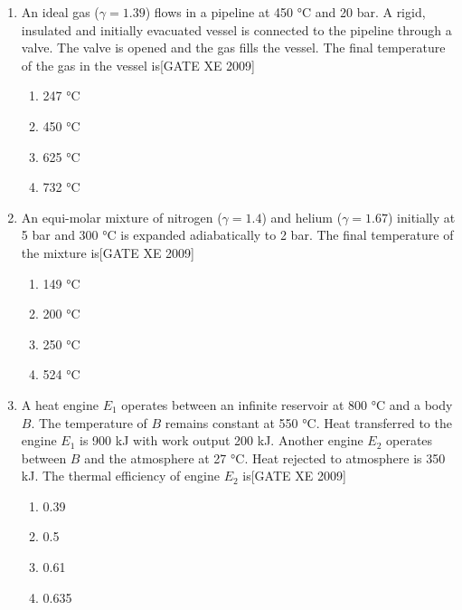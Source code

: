\documentclass[journal,12pt,onecolumn]{IEEEtran}
\theoremstyle{remark}
\begin{document}
\begin{enumerate}
\item An ideal gas ($\gamma=1.39$) flows in a pipeline at 450 °C and 20 bar. A rigid, insulated and initially evacuated vessel is connected to the pipeline through a valve. The valve is opened and the gas fills the vessel. The final temperature of the gas in the vessel is\hfill[GATE XE 2009]
\begin{multicols}{2}
\begin{enumerate}
    \item 247 °C
    \item 450 °C
    \item 625 °C
    \item 732 °C
\end{enumerate}
\end{multicols}



\item An equi-molar mixture of nitrogen ($\gamma=1.4$) and helium ($\gamma=1.67$) initially at 5 bar and 300 °C is expanded adiabatically to 2 bar. The final temperature of the mixture is\hfill[GATE XE 2009]
\begin{multicols}{2}
\begin{enumerate}
    \item 149 °C
    \item 200 °C
    \item 250 °C
    \item 524 °C
\end{enumerate}
\end{multicols}



\item A heat engine $E_1$ operates between an infinite reservoir at 800 °C and a body $B$. The temperature of $B$ remains constant at 550 °C. Heat transferred to the engine $E_1$ is 900 kJ with work output 200 kJ. Another engine $E_2$ operates between $B$ and the atmosphere at 27 °C. Heat rejected to atmosphere is 350 kJ. The thermal efficiency of engine $E_2$ is\hfill[GATE XE 2009]
\begin{multicols}{2}
\begin{enumerate}
    \item 0.39
    \item 0.5
    \item 0.61
    \item 0.635
\end{enumerate}
\end{multicols}




\end{enumerate}
\end{document}
